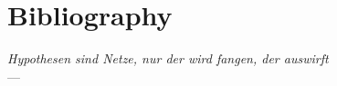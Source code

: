 

%
{} %
\chapter*{Bibliography}

\begin{flushright}{\slshape
    Hypothesen sind Netze, nur der wird fangen, der auswirft} \\ \medskip
    --- \cite{novalis_novalis_1837}
\end{flushright}

\printbibliography[
heading=none
]

%
\manualmark
\markboth{\spacedlowsmallcaps{\bibname}}{\spacedlowsmallcaps{\bibname}}
%
